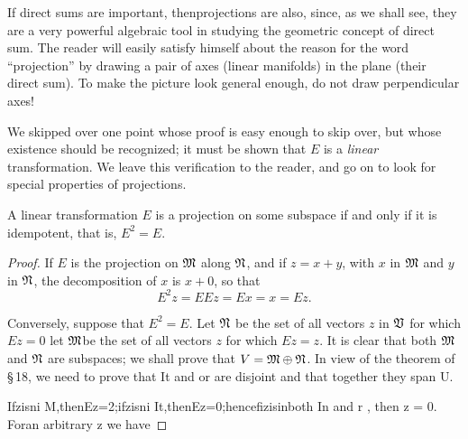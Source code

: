 If direct sums are important, thenprojections are also, since, as we shall see,
they are a very powerful algebraic tool in studying the geometric concept of
direct sum. The reader will easily satisfy himself about the reason for the word
``projection'' by drawing a pair of axes (linear manifolds) in the plane (their
direct sum). To make the picture look general enough, do not draw perpendicular
axes!

We skipped over one point whose proof is easy enough to skip over, but whose
existence should be recognized; it must be shown that \(E\) is a \emph{linear}
transformation. We leave this verification to the reader, and go on to look for
special properties of projections.

\begin{theorem}
    A linear transformation \(E\) is a projection on some subspace if and only if it is idempotent, that is, \(E^2 = E\).
\end{theorem}

\begin{proof}
    If \(E\) is the projection on \(\frak{M}\) along \(\frak{N}\), and if \(z =
    x + y\), with \(x\) in \(\frak{M}\) and \(y\) in \(\frak{N}\), the
    decomposition of \(x\) is \(x + 0\), so that
    \begin{equation*}
        E^2 z = EEz = Ex = x = Ez.
    \end{equation*}

    Conversely, suppose that \(E^2 = E\). Let \(\frak{N}\) be the set of all vectors \(z\) in \(\frak{V}\) for which \(Ez = 0\) let \(\frak{M}\)be the set of all vectors \(z\) for which \(Ez = z\). It is clear that both \(\frak{M}\)
    and \(\frak{N}\) are subspaces; we shall prove that \(V = \frak{M} \oplus \frak{N}\). In view of the theorem of \S\,18, we need to prove that It and or are disjoint and that together they span U.
    
    Ifzisni M,thenEz=2;ifzisni It,thenEz=0;hencefizisinboth In and r , then z = 0. Foran arbitrary z we have
\end{proof}